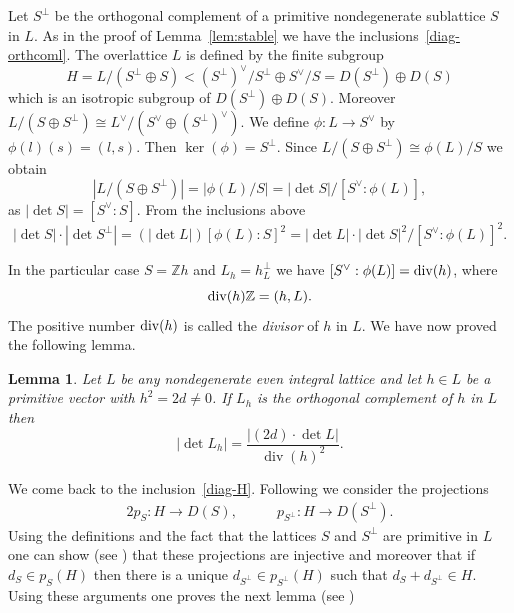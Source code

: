 \documentclass[a4paper,11pt]{article}
\newtheorem{lemma}{Lemma}[section]
\newcommand{\ZZ}{\mathbb Z}
\newcommand{\divv}{\mathop{\null\mathrm {div}}\nolimits}
\renewcommand{\div}{\mathop{\mathrm {div}}\nolimits}
\begin{document}
Let $S^{\perp}$ be the orthogonal complement of a primitive
nondegenerate sublattice $S$ in $L$. As in the proof of
Lemma~\ref{lem:stable} we have the inclusions~\eqref{diag-orthcoml}.
The overlattice $L$ is defined by the finite subgroup
\begin{equation}\label{diag-H}
H=L/(S^{\perp}\oplus S)<(S^\perp)^\vee/S^\perp \oplus S^\vee/S=
D(S^\perp)\oplus D(S)
\end{equation}
which is an isotropic subgroup of $D(S^\perp)\oplus D(S)$.
Moreover   $L/(S\oplus S^\perp)\cong L^\vee/(S^\vee\oplus (S^\perp)^\vee)$.
We define  $\phi\colon L\to S^\vee$ by $\phi(l)(s)=(l,s)$.
Then $\ker(\phi)=S^\perp$.
Since $L/(S\oplus S^\perp)\cong \phi(L)/S$ we obtain
\begin{equation*}
|L/(S\oplus S^\perp)|= |\phi(L)/S|=|\det S|/[S^\vee:\phi(L)],
\end{equation*}
as $|\det S|=[S^\vee:S]$.  From the inclusions above
\begin{equation*}
|\det S|\cdot|\det S^\perp|=(|\det L|)[\phi(L):S]^2
=|\det L|\cdot|\det S|^2/[S^\vee:\phi(L)]^2.
\end{equation*}

In the particular case $S=\ZZ h$ and $L_h=h^\perp_L$
we have $[S^\vee:\phi(L)]=\divv(h)$, where
\begin{equation}\label{def:divv}
\divv(h)\ZZ=(h,L).
\end{equation}
The positive number $\divv(h)$ is called the \emph{divisor} of $h$ in
$L$. We have now proved the following lemma.

\begin{lemma}\label{lem:hperp}
Let $L$ be any nondegenerate even integral lattice and let $h\in L$
be a primitive vector with $h^2=2d\ne 0$. If $L_h$ is the orthogonal
complement of $h$ in $L$ then
\begin{equation*}
|\det L_h|=\frac {|(2d)\cdot \det L|}{\div (h)^2}.
\end{equation*}
\end{lemma}


We come back to the inclusion~\eqref{diag-H}.
Following \cite{Nik2} we consider the projections
\begin{alignat*}{2}
p_S\colon H \to D(S),\qquad & p_{S^\perp}\colon H\to D(S^\perp).
\end{alignat*}
Using the definitions and the fact that the lattices $S$ and $S^\perp$
are primitive in $L$ one can show (see \cite[Prop. 1.5.1]{Nik2}) that
these projections are injective and moreover that if $d_S\in p_S(H)$
then there is a unique $d_{S^\perp}\in p_{S^\perp}(H)$ such that
$d_S+d_{S^\perp}\in H$.  Using these arguments one proves the next
lemma (see \cite[Lemma 3.2]{GHSsymp})
\end{document}
